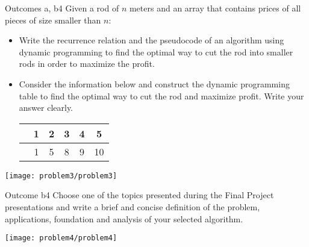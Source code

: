 \begin{problem}{Outcomes a, b}{4}
Given a rod of $n$ meters and an array that contains prices of all pieces of size smaller than $n$:
\begin{itemize}
    \item Write the recurrence relation and the pseudocode of an algorithm using dynamic programming to find the optimal way to cut the rod into smaller rods in order to maximize the profit.
    \item Consider the information below and construct the dynamic programming table to find the optimal way to cut the rod and maximize profit. Write your answer clearly.
    \begin{center}
        \begin{tabular}{S|SSSSS}
              & 1 & 2 & 3 & 4 & 5 \\ \midrule
             & 1 & 5 & 8 & 9 & 10 \\
        \end{tabular}
    \end{center}
\end{itemize}

\begin{center}
    \texttt{[image: problem3/problem3]}%
\end{center}

\end{problem}

\begin{problem}{Outcome b}{4}
    Choose one of the topics presented during the Final Project presentations and write a brief and concise definition of the problem, applications, foundation and analysis of your selected algorithm.

    \begin{center}
        \texttt{[image: problem4/problem4]}%
    \end{center}

\end{problem}

